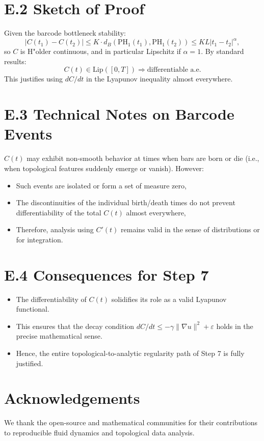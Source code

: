 \documentclass[11pt]{article}
\theoremstyle{definition}
\begin{document}
\section*{E.2 Sketch of Proof}
Given the barcode bottleneck stability:
\[
|C(t_1) - C(t_2)| \leq K \cdot d_B(\mathrm{PH}_1(t_1), \mathrm{PH}_1(t_2)) \leq KL |t_1 - t_2|^\alpha,
\]
so $C$ is H"older continuous, and in particular Lipschitz if $\alpha=1$. By standard results:
\[
C(t) \in \mathrm{Lip}([0,T]) \Rightarrow \text{differentiable a.e.}
\]
This justifies using $dC/dt$ in the Lyapunov inequality almost everywhere.

\section*{E.3 Technical Notes on Barcode Events}
$C(t)$ may exhibit non-smooth behavior at times when bars are born or die (i.e., when topological features suddenly emerge or vanish). However:
\begin{itemize}
  \item Such events are isolated or form a set of measure zero,
  \item The discontinuities of the individual birth/death times do not prevent differentiability of the total $C(t)$ almost everywhere,
  \item Therefore, analysis using $C'(t)$ remains valid in the sense of distributions or for integration.
\end{itemize}

\section*{E.4 Consequences for Step 7}
\begin{itemize}
  \item The differentiability of $C(t)$ solidifies its role as a valid Lyapunov functional.
  \item This ensures that the decay condition $dC/dt \leq -\gamma \|\nabla u\|^2 + \varepsilon$ holds in the precise mathematical sense.
  \item Hence, the entire topological-to-analytic regularity path of Step 7 is fully justified.
\end{itemize}


\section*{Acknowledgements}
We thank the open-source and mathematical communities for their contributions to reproducible fluid dynamics and topological data analysis.
\end{document}

